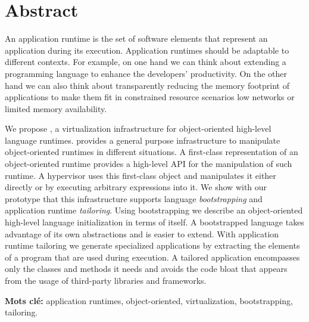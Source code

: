 \documentclass[a4paper,11pt,twoside]{include/ThesisStyle}
\begin{document}
\section*{Abstract}
\footnotesize
An application runtime is the set of software elements that represent an application during its execution. Application runtimes should be adaptable to different contexts. For example, on one hand we can think about extending a programming language to enhance the developers' productivity. On the other hand we can also think about transparently reducing the memory footprint of applications to make them fit in constrained resource scenarios \eg low networks or limited memory availability.

We propose \Vtt, a virtualization infrastructure for object-oriented high-level language runtimes. \Vtt provides a general purpose infrastructure to manipulate object-oriented runtimes in different situations. A first-class representation of an object-oriented runtime provides a high-level API for the manipulation of such runtime. A hypervisor uses this first-class object and manipulates it either directly or by executing arbitrary expressions into it.
We show with our prototype that this infrastructure supports language \emph{bootstrapping} and application runtime \emph{tailoring}. Using bootstrapping we describe an object-oriented high-level language initialization in terms of itself. A bootstrapped language takes advantage of its own abstractions and is easier to extend. With application runtime tailoring we generate specialized applications by extracting the elements of a program that are used during execution. A tailored application encompasses only the classes and methods it needs and avoids the code bloat that appears from the usage of third-party libraries and frameworks.\newline

\textbf{Mots cl\'e:} application runtimes, object-oriented, virtualization, bootstrapping, tailoring.

\thispagestyle{empty}
\end{document}
